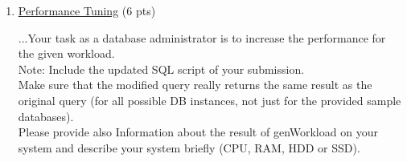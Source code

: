 \documentclass[10pt]{article}
\begin{document}
\begin{enumerate}

			
			
			
			

			
			
			
			
			
			
		
		
		\item \underline{Performance Tuning} (6 pts)
		
		
		...Your task as a database administrator is to
		increase the performance for the given workload.\\
		Note: Include the updated SQL script of your submission.\\
		Make sure that the modified
		query really returns the same result as the original query (for all possible DB instances, not
		just for the provided sample databases).\\
		Please provide also Information about the result of
		genWorkload on your system and describe your system briefly (CPU, RAM, HDD or SSD).
		

\end{enumerate}
\end{document}
